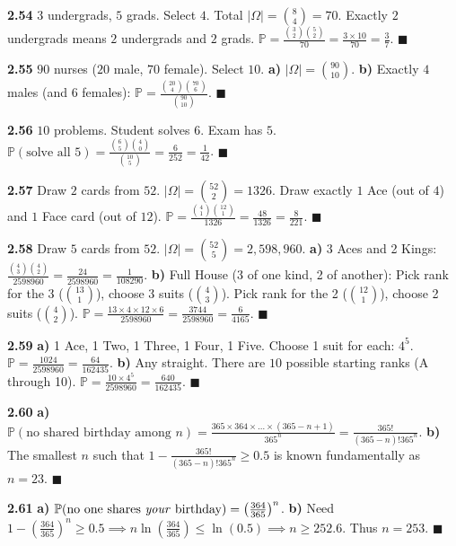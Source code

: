 \documentclass[11pt]{article}
\theoremstyle{definition}
\begin{document}
\textbf{2.54} 
$3$ undergrads, $5$ grads. Select $4$. Total $|\Omega| = \binom{8}{4} = 70$.
Exactly $2$ undergrads means $2$ undergrads and $2$ grads.
$\mathbb{P} = \frac{\binom{3}{2} \binom{5}{2}}{70} = \frac{3 \times 10}{70} = \frac{3}{7}$. $\blacksquare$

\textbf{2.55} 
$90$ nurses ($20$ male, $70$ female). Select $10$.
\textbf{a)} $|\Omega| = \binom{90}{10}$.
\textbf{b)} Exactly $4$ males (and $6$ females): $\mathbb{P} = \frac{\binom{20}{4} \binom{70}{6}}{\binom{90}{10}}$. $\blacksquare$

\textbf{2.56} 
$10$ problems. Student solves $6$. Exam has $5$.
$\mathbb{P}(\text{solve all 5}) = \frac{\binom{6}{5} \binom{4}{0}}{\binom{10}{5}} = \frac{6}{252} = \frac{1}{42}$. $\blacksquare$

\textbf{2.57} 
Draw $2$ cards from $52$. $|\Omega| = \binom{52}{2} = 1326$.
Draw exactly $1$ Ace (out of $4$) and $1$ Face card (out of $12$).
$\mathbb{P} = \frac{\binom{4}{1} \binom{12}{1}}{1326} = \frac{48}{1326} = \frac{8}{221}$. $\blacksquare$

\textbf{2.58} 
Draw $5$ cards from $52$. $|\Omega| = \binom{52}{5} = 2,598,960$.
\textbf{a)} 3 Aces and 2 Kings: $\frac{\binom{4}{3} \binom{4}{2}}{2598960} = \frac{24}{2598960} = \frac{1}{108290}$.
\textbf{b)} Full House (3 of one kind, 2 of another): Pick rank for the 3 ($\binom{13}{1}$), choose 3 suits ($\binom{4}{3}$). Pick rank for the 2 ($\binom{12}{1}$), choose 2 suits ($\binom{4}{2}$).
$\mathbb{P} = \frac{13 \times 4 \times 12 \times 6}{2598960} = \frac{3744}{2598960} = \frac{6}{4165}$. $\blacksquare$

\textbf{2.59} 
\textbf{a)} 1 Ace, 1 Two, 1 Three, 1 Four, 1 Five. Choose 1 suit for each: $4^5$. $\mathbb{P} = \frac{1024}{2598960} = \frac{64}{162435}$.
\textbf{b)} Any straight. There are $10$ possible starting ranks (A through 10).
$\mathbb{P} = \frac{10 \times 4^5}{2598960} = \frac{640}{162435}$. $\blacksquare$

\textbf{2.60} 
\textbf{a)} $\mathbb{P}(\text{no shared birthday among } n) = \frac{365 \times 364 \times \dots \times (365-n+1)}{365^n} = \frac{365!}{(365-n)! 365^n}$.
\textbf{b)} The smallest $n$ such that $1 - \frac{365!}{(365-n)! 365^n} \geq 0.5$ is known fundamentally as $n=23$. $\blacksquare$

\textbf{2.61} 
\textbf{a)} $\mathbb{P}(\text{no one shares \textit{your} birthday}) = \left(\frac{364}{365}\right)^n$.
\textbf{b)} Need $1 - \left(\frac{364}{365}\right)^n \geq 0.5 \implies n \ln\left(\frac{364}{365}\right) \leq \ln(0.5) \implies n \geq 252.6$. Thus $n=253$. $\blacksquare$
\end{document}

